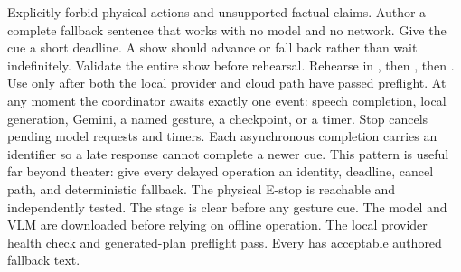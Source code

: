 Explicitly forbid physical actions and unsupported factual claims.\markdownRendererOlItemEnd 
{}Author a complete fallback sentence that works with no model and no network.\markdownRendererOlItemEnd 
{}Give the cue a short deadline. A show should advance or fall back rather\markdownRendererSoftLineBreak
{}than wait indefinitely.\markdownRendererOlItemEnd 
{}Validate the entire show before rehearsal.\markdownRendererOlItemEnd 
{}Rehearse in , then , then .\markdownRendererOlItemEnd 
{}Use  only after both the local provider and cloud path have\markdownRendererSoftLineBreak
{}passed preflight.\markdownRendererOlItemEnd 
\markdownRendererOlEnd \markdownRendererInterblockSeparator
{}
\markdownRendererSectionEnd \markdownRendererSectionBegin
{}\markdownRendererInterblockSeparator
{}At any moment the coordinator awaits exactly one event: speech completion,\markdownRendererSoftLineBreak
{}local generation, Gemini, a named gesture, a checkpoint, or a timer. Stop\markdownRendererSoftLineBreak
{}cancels pending model requests and timers. Each asynchronous completion carries\markdownRendererSoftLineBreak
{}an identifier so a late response cannot complete a newer cue. This pattern is\markdownRendererSoftLineBreak
{}useful far beyond theater: give every delayed operation an identity, deadline,\markdownRendererSoftLineBreak
{}cancel path, and deterministic fallback.\markdownRendererInterblockSeparator
{}
\markdownRendererSectionEnd \markdownRendererSectionBegin
{}\markdownRendererInterblockSeparator
{}\markdownRendererUlBegin
\markdownRendererUlItem The physical E-stop is reachable and independently tested.\markdownRendererUlItemEnd 
\markdownRendererUlItem The stage is clear before any gesture cue.\markdownRendererUlItemEnd 
\markdownRendererUlItem The model and VLM are downloaded before relying on offline operation.\markdownRendererUlItemEnd 
\markdownRendererUlItem The local provider health check and generated-plan preflight pass.\markdownRendererUlItemEnd 
\markdownRendererUlItem Every  has acceptable authored fallback text.\markdownRendererUlItemEnd 

